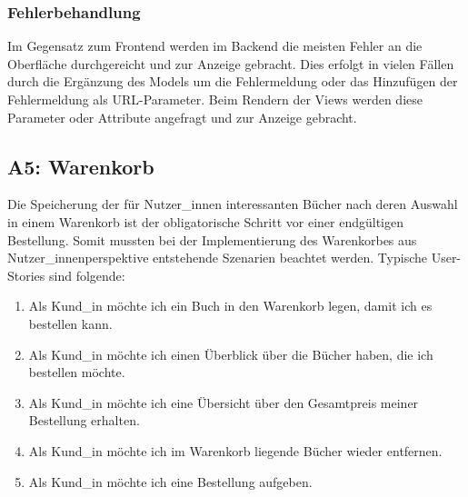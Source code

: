 		\subsubsection{Fehlerbehandlung}
		Im Gegensatz zum Frontend werden im Backend die meisten Fehler an die Oberfläche durchgereicht und zur Anzeige gebracht. Dies erfolgt in vielen Fällen durch die Ergänzung des Models um die Fehlermeldung oder das Hinzufügen der Fehlermeldung als URL-Parameter. Beim Rendern der Views werden diese Parameter oder Attribute angefragt und zur Anzeige gebracht.
	
	\subsection{A5: Warenkorb}\label{sec:umsetzung:cart}
	Die Speicherung der für Nutzer\_innen interessanten Bücher nach deren Auswahl in einem Warenkorb ist der obligatorische Schritt vor einer endgültigen Bestellung. Somit mussten bei der Implementierung des Warenkorbes aus Nutzer\_innenperspektive entstehende Szenarien beachtet werden. Typische User-Stories sind folgende:
	
	\begin{enumerate}
		\item Als Kund\_in möchte ich ein Buch in den Warenkorb legen, damit ich es bestellen kann.
		\item Als Kund\_in möchte ich einen Überblick über die Bücher haben, die ich bestellen möchte.
		\item Als Kund\_in möchte ich eine Übersicht über den Gesamtpreis meiner Bestellung erhalten.
		\item Als Kund\_in möchte ich im Warenkorb liegende Bücher wieder entfernen.
		\item Als Kund\_in möchte ich eine Bestellung aufgeben.
	\end{enumerate}
	
